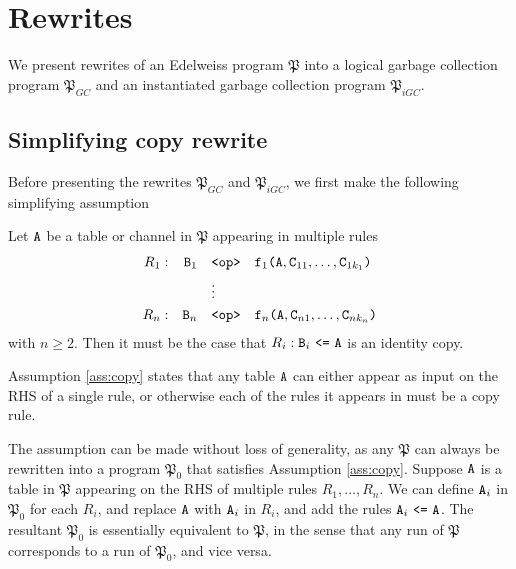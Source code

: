 
\section{Rewrites}
\label{sec:rewrites}

We present rewrites of an Edelweiss program $\mathfrak{P}$ into a logical garbage collection program $\mathfrak{P}_{GC}$ and an instantiated garbage collection program $\mathfrak{P}_{iGC}$. 

\setcounter{subsection}{-1}
\subsection{Simplifying copy rewrite}
Before presenting the rewrites $\mathfrak{P}_{GC}$ and $\mathfrak{P}_{iGC}$, we first make the following simplifying assumption
\begin{assumption}
\label{ass:copy}
Let $\tt{A}$ be a table or channel in $\mathfrak{P}$ appearing in multiple rules
\begin{align*}
R_1: && \tt{B}_1 &\quad\tt{<op>}\quad \tt{f}_1\tt{(}\tt{A},\tt{C}_{11},\dots,\tt{C}_{1k_1}\tt{)}\\
&&&\quad\vdots\\
R_n: && \tt{B}_n &\quad\tt{<op>}\quad \tt{f}_n\tt{(}\tt{A},\tt{C}_{n1},\dots,\tt{C}_{nk_n}\tt{)}
\end{align*}
with $n \geq 2$.
Then it must be the case that $R_i: \tt{B}_i ~\tt{<=}~ \tt{A}$ is an identity copy.
\end{assumption}
Assumption \ref{ass:copy} states that any table $\tt{A}$ can either appear as input on the RHS of a single rule, or otherwise each of the rules it appears in must be a copy rule.

The assumption can be made without loss of generality, as any $\mathfrak{P}$ can always be rewritten into a program $\mathfrak{P}_0$ that satisfies Assumption \ref{ass:copy}.
Suppose $\tt{A}$ is a table in $\mathfrak{P}$ appearing on the RHS of multiple rules $R_1,\dots,R_n$.
We can define $\tt{A}_i$ in $\mathfrak{P}_0$ for each $R_i$, and replace $\tt{A}$ with $\tt{A}_i$ in $R_i$, and add the rules $\tt{A}_i ~\tt{<=}~ \tt{A}$.
The resultant $\mathfrak{P}_0$ is essentially equivalent to $\mathfrak{P}$, in the sense that any run of $\mathfrak{P}$ corresponds to a run of $\mathfrak{P}_0$, and vice versa.

